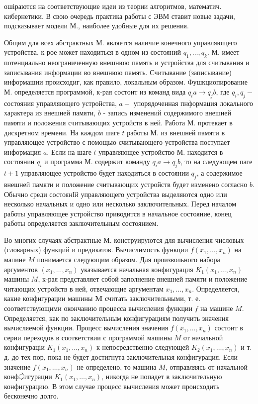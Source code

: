 \documentclass[10pt]{article}
\begin{document}
ошіраются на соответствующие идеи из теории алгоритмов, математич. кибернетики. В свою очередь практика работы с ЭВМ ставит новые задачи, подсказывает модели М., наиболее удобные для их решения.



Общим для всех абстрактных М. является наличие конечного управляющего устройства, к-рое может находиться в одном из состояний $q_{1}, \ldots, q_{k}$. М. имеет потенциально неограниченную внешнюю память и устройства для считывания и записывания информации во внешнюю память. Считывание (записывание) информашии происходиг, как правило, локальным образом. Фушкциопирование М. определяется программой, к-рая состоит из команд вида $q_{i} a \rightarrow q_{j} b$, где $q_{i}, q_{j}-$ состояния управляющего устройства, $a-$ упорядоченная пнформация локального характера из внешней памяти, $b$ - запись изменений содержимого внешней памяти и положения считывающих устройств в ней. Работа М. протекает в дискретном времени. На каждом шаге $t$ работы М. из внешней памяти в управляющее устройство с помощью считывающего устройства поступает информация $a$. Если на шаге $t$ управляющее устройство М. находится в состоянии $q_{i}$ и программа М. содержит команду $q_{i} a \rightarrow q_{j} b$, то на следующем паге $t+1$ управляющее устройство будет находиться в состоянии $q_{j}$, а содержимое внешней памяти и положение считывающих устройств будет изменено согласно $b$. Обычно среди состоянІй управляющего устройства выделяются одно или несколько начальных и одно или несколько заключительных. Перед началом работы управляющее устройство приводится в начальное состояние, конец работы определяется заключительным состоянием.



Во многих случаях абстрактные М. конструируются для вычисления числовых (словарных) функций и предикатов. Вычислимость функции $f\left(x_{1}, \ldots, x_{n}\right)$ на мапине $M$ понимается следующим образом. Для произвольного набора аргументов $\left(x_{1}, \ldots, x_{n}\right)$ указывается начальная конфигурация $K_{1}\left(x_{1}, \ldots, x_{n}\right)$ машины $M$, к-рая представляет собой заполнение внешней памяти и положение читающих устройств в ней, отвечающие аргументам $x_{1}, \ldots, x_{n}$. Определяется, какие конфигурации машины $\boldsymbol{M}$ считать заключительными, т. е. соответствующими окончанию процесса вычисления функции $f$ на машине $M$. Определяется, как по заключительным конфигурациям получить значения вычисляемой функции. Процесс вычисления значения $f\left(x_{1}, \ldots, x_{n}\right)$ состоит в серии переходов в соответствии с программой машины $M$ от начальной конфигураціи $K_{1}\left(x_{1}, \ldots, x_{n}\right)$ к непосредственно следующей $K_{2}\left(x_{1}, \ldots, x_{n}\right)$ и т. д. до тех пор, пока не будет достигнута заключительная конфигурация. Если значение $f\left(x_{1}, \ldots, x_{n}\right)$ не определено, то машина $M$, отправляясь от начальной конф्रेигурации $K_{1}\left(x_{1}, \ldots, x_{n}\right)$, никогда не попадет в заключительную конфигурацию. В этом случае процесс вычисления может происходить бесконечно долго.
\end{document}
